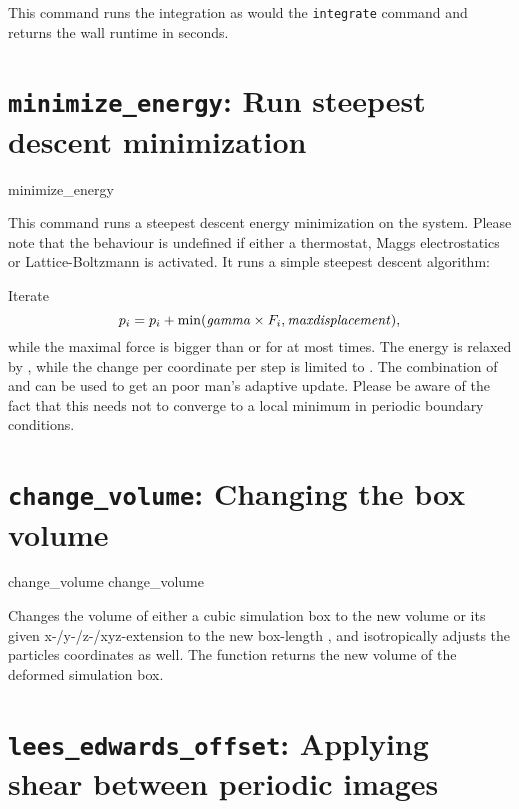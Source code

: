 This command runs the integration as would the \texttt{integrate} command and
returns the wall runtime in seconds.

\section{\texttt{minimize_energy}: Run steepest descent minimization}

\begin{essyntax}
   minimize_energy    
\end{essyntax}

This command runs a steepest descent energy minimization on the system.
Please note that the behaviour is undefined if either a thermostat, Maggs electrostatics or Lattice-Boltzmann is activated.
It runs a simple steepest descent algorithm:

Iterate
$$p_i = p_i + \min(\text{\ensuremath{\mathrm{\mathit{gamma}}}} \times F_i, \text{\ensuremath{\mathrm{\mathit{maxdisplacement}}}}),$$
while the maximal force is bigger than  or for at most  times.
The energy is relaxed by , while the change per coordinate per step is limited to .
The combination of  and  can be used to get an poor man's adaptive update.
Please be aware of the fact that this needs not to converge to a local minimum in periodic boundary conditions.

\section{\texttt{change_volume}: Changing the box volume}

\begin{essyntax}
   change_volume  
   change_volume  
\end{essyntax}
Changes the volume of either a cubic simulation box to the new volume
 or its given x-/y-/z-/xyz-extension to the new
box-length , and isotropically adjusts the
particles coordinates as well. The function returns the new volume of
the deformed simulation box.

\section{\texttt{lees_edwards_offset}: Applying shear between periodic images}
\label{sec:lees-edwards}


